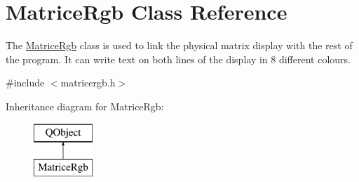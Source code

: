 \hypertarget{class_matrice_rgb}{\section{Matrice\+Rgb Class Reference}
\label{class_matrice_rgb}
}


The \hyperlink{class_matrice_rgb}{Matrice\+Rgb} class is used to link the physical matrix display with the rest of the program. It can write text on both lines of the display in 8 different colours.  




{\ttfamily \#include $<$matricergb.\+h$>$}

Inheritance diagram for Matrice\+Rgb\+:\begin{figure}[H]
\begin{center}
\leavevmode
\includegraphics[height=2.000000cm]{class_matrice_rgb}
\end{center}
\end{figure}
